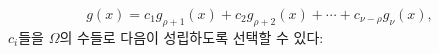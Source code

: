 
\[
g(x)=c_1g_{\rho+1}(x)+c_2g_{\rho+2}(x)+\cdots+c_{\nu-\rho}g_\nu(x),
\]
$c_i$들을 $\Omega$의 수들로 다음이 성립하도록 선택할 수 있다:

